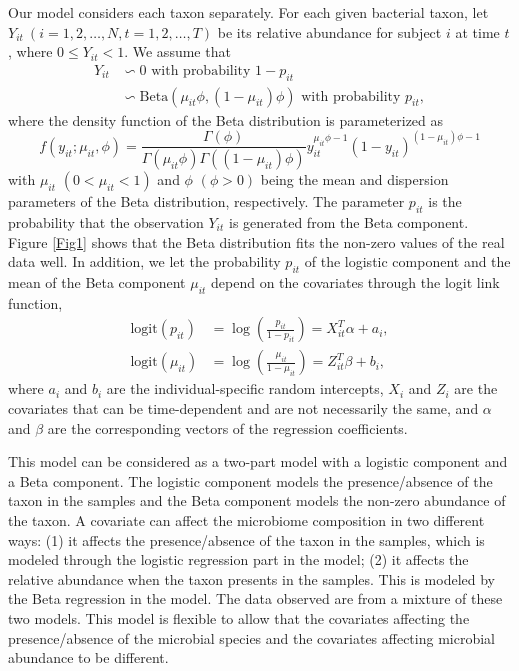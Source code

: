 Our model considers each taxon separately. For each given bacterial taxon, let $Y_{it}~(i = 1,2,\ldots,N, t= 1,2,\dots,T)$ be its relative abundance for subject $i$ at time $t$, where $0 \le Y_{it} < 1$.   We assume that 
\begin{align}
Y_{it} &\backsim 0 \text{ with probability } 1-p_{it}\\
&\backsim \mbox{Beta}(\mu_{it}\phi,(1-\mu_{it})\phi) \text{ with probability } p_{it},
\end{align}
where the  density function of the Beta distribution is parameterized as
\begin{equation}\label{beta1}
f(y_{it};\mu_{it},\phi) = \frac{ \Gamma(\phi)}{ \Gamma(\mu_{it}\phi)\Gamma((1-\mu_{it})\phi)}y_{it}^{\mu_{it}\phi-1}(1-y_{it})^{(1-\mu_{it})\phi-1}
\end{equation}
with $\mu_{it}$ $(0<\mu_{it}<1)$ and $\phi$ $(\phi>0)$ being  the mean and dispersion parameters of the Beta distribution, respectively. The parameter $p_{it}$ is the probability that the observation $Y_{it}$ is generated from the Beta component. Figure \ref{Fig1}  shows that the Beta distribution fits  the non-zero values of the real data well.  In addition,  we let the probability $p_{it}$ of the logistic component and the mean of the Beta component $\mu_{it}$ depend on the covariates through the logit link function,
\begin{align}
\mbox{logit}(p_{it})&= \log\left(\frac{p_{it}}{1-p_{it}}\right) = X_{it}^T \alpha + a_i,\label{logit1}\\ 
\mbox{logit}(\mu_{it})&= \log \left(\frac{\mu_{it}}{1-\mu_{it}}\right) = Z_{it}^T \beta + b_i,\label{logit2}
\end{align}
where $a_i$ and $b_i$ are the individual-specific random intercepts,  $X_i$ and $Z_i$ are the covariates that can be time-dependent and are  not necessarily  the same, and $\alpha$ and $\beta$ are the corresponding vectors of the regression coefficients. 

This model can be considered as a two-part model with a logistic component and a Beta component. The logistic component  models the presence/absence of the taxon in the samples and the Beta component  models the non-zero abundance of the taxon.  A covariate can  affect the microbiome composition  in two different   ways: (1) it  affects the presence/absence of the taxon in the samples, which is modeled through the logistic regression part in the model; (2) it affects the relative abundance when the taxon presents in the samples. This is modeled by the Beta regression in the model. The data observed are from  a mixture of these two models.  This model is flexible to allow  that the covariates affecting  the presence/absence of the microbial species and the covariates affecting  microbial abundance to be different. 

